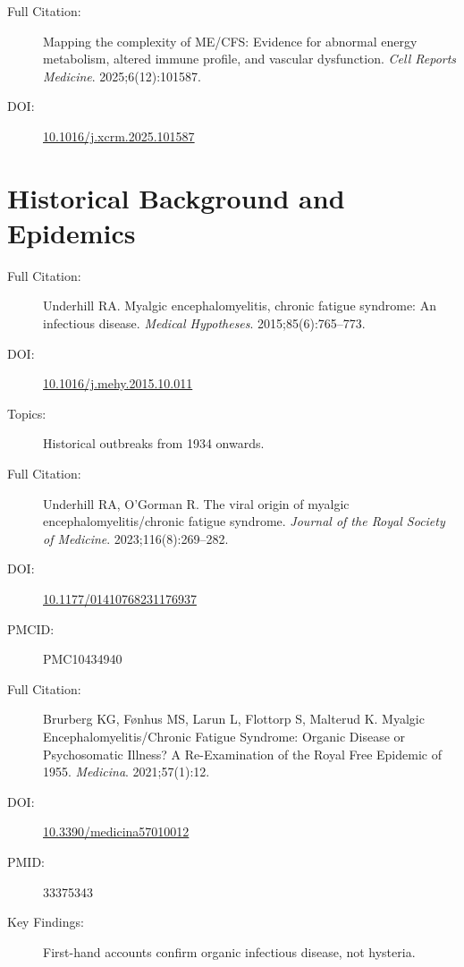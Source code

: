 \begin{description}
    \item[Full Citation:] Mapping the complexity of ME/CFS: Evidence for abnormal energy metabolism, altered immune profile, and vascular dysfunction. \textit{Cell Reports Medicine}. 2025;6(12):101587.
    \item[DOI:] \href{https://doi.org/10.1016/j.xcrm.2025.101587}{10.1016/j.xcrm.2025.101587}
\end{description}

\section{Historical Background and Epidemics}
\label{sec:bib-history}

\begin{description}
    \item[Full Citation:] Underhill RA. Myalgic encephalomyelitis, chronic fatigue syndrome: An infectious disease. \textit{Medical Hypotheses}. 2015;85(6):765--773.
    \item[DOI:] \href{https://doi.org/10.1016/j.mehy.2015.10.011}{10.1016/j.mehy.2015.10.011}
    \item[Topics:] Historical outbreaks from 1934 onwards.
\end{description}

\begin{description}
    \item[Full Citation:] Underhill RA, O'Gorman R. The viral origin of myalgic encephalomyelitis/chronic fatigue syndrome. \textit{Journal of the Royal Society of Medicine}. 2023;116(8):269--282.
    \item[DOI:] \href{https://doi.org/10.1177/01410768231176937}{10.1177/01410768231176937}
    \item[PMCID:] PMC10434940
\end{description}

\begin{description}
    \item[Full Citation:] Brurberg KG, Fønhus MS, Larun L, Flottorp S, Malterud K. Myalgic Encephalomyelitis/Chronic Fatigue Syndrome: Organic Disease or Psychosomatic Illness? A Re-Examination of the Royal Free Epidemic of 1955. \textit{Medicina}. 2021;57(1):12.
    \item[DOI:] \href{https://doi.org/10.3390/medicina57010012}{10.3390/medicina57010012}
    \item[PMID:] 33375343
    \item[Key Findings:] First-hand accounts confirm organic infectious disease, not hysteria.
\end{description}

